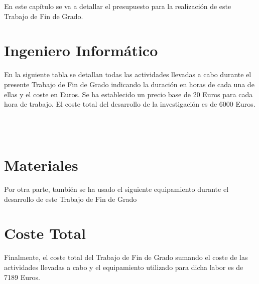 

En este capítulo se va a detallar el presupuesto para la realización de este Trabajo de Fin de Grado.

\section{Ingeniero Informático}

En la siguiente tabla se detallan todas las actividades llevadas a cabo durante el presente Trabajo de Fin de Grado indicando la duración en horas de cada una de ellas y el coste en Euros. 
Se ha establecido un precio base de 20 Euros para cada hora de trabajo. El coste total del desarrollo de la investigación es de 6000 Euros.


\\
\bigskip    
\\

\section{Materiales}
Por otra parte, también se ha usado el siguiente equipamiento durante el desarrollo de este Trabajo de Fin de Grado




\section{Coste Total}
Finalmente, el coste total del Trabajo de Fin de Grado sumando el coste de las actividades llevadas a cabo y el equipamiento utilizado para dicha labor es de 7189 Euros.